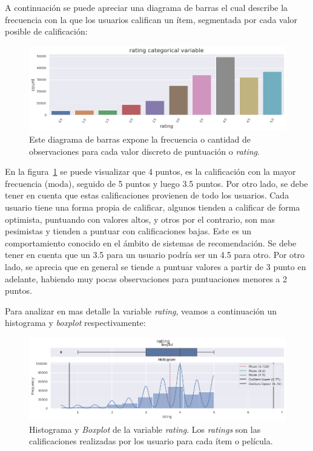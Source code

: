 \documentclass[11pt,a4paper,twoside]{thesis}
\begin{document}
A continuación se puede apreciar una diagrama de barras el cual describe la
frecuencia con la que los usuarios califican un ítem, segmentada por cada valor
posible de calificación:

\begin{figure}[h!]
	\centering
	\includegraphics[width=15cm]{./images/rating-barplot.png}
	\caption{Este diagrama de barras expone la frecuencia o cantidad de observaciones para cada valor discreto de puntuación o \textit{rating}.}
	\label{fig:ratingsBarPlot}
\end{figure}

En la figura~\ref{fig:ratingsBarPlot} se puede visualizar que 4 puntos, es la
calificación con la mayor frecuencia (moda), seguido de 5 puntos y luego 3.5
puntos. Por otro lado, se debe tener en cuenta que estas calificaciones
provienen de todo los usuarios. Cada usuario tiene una forma propia de
calificar, algunos tienden a calificar de forma optimista, puntuando con
valores altos, y otros por el contrario, son mas pesimistas y tienden a puntuar
con calificaciones bajas. Este es un comportamiento conocido en el ámbito de
sistemas de recomendación. Se debe tener en cuenta que un 3.5 para un usuario
podría ser un 4.5 para otro. Por otro lado, se aprecia que en general se tiende
a puntuar valores a partir de 3 punto en adelante, habiendo muy pocas
observaciones para puntuaciones menores a 2 puntos.

\clearpage

Para analizar en mas detalle la variable \textit{rating}, veamos a continuación
un histograma y \textit{boxplot} respectivamente:

\begin{center}
\end{center}

\begin{figure}[h!]
	\centering
	\includegraphics[width=15cm]{./images/rating-boxplot-histplot.png}
	\caption{Histograma y \textit{Boxplot} de la variable \textit{rating}. Los \textit{ratings} son las calificaciones realizadas por los usuario para cada ítem o película.}
	\label{fig:ratingsHistPlot}
\end{figure}
\end{document}

